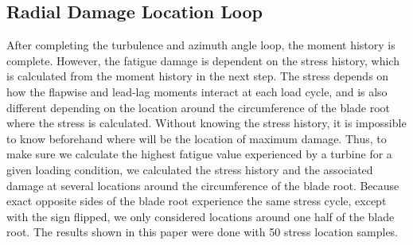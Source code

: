 \documentclass[11pt,letterpaper]{article}
\begin{document}
\subsection{Radial Damage Location Loop}

After completing the turbulence and azimuth angle loop, the moment history is complete. However, the fatigue damage is dependent on the stress history, which is calculated from the moment history in the next step. The stress depends on how the flapwise and lead-lag moments interact at each load cycle, and is also different depending on the location around the circumference of the blade root where the stress is calculated. Without knowing the stress history, it is impossible to know beforehand where will be the location of maximum damage. Thus, to make sure we calculate the highest fatigue value experienced by a turbine for a given loading condition, we calculated the stress history and the associated damage at several locations around the circumference of the blade root. Because exact opposite sides of the blade root experience the same stress cycle, except with the sign flipped, we only considered locations around one half of the blade root. The results shown in this paper were done with 50 stress location samples.
\end{document}
